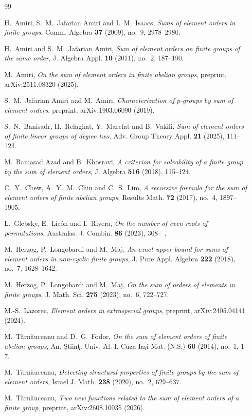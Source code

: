 \documentclass[10pt]{article}
\begin{document}
\begin{thebibliography}{99}

H.~Amiri, S.~M.~Jafarian Amiri and I.~M.~Isaacs,
\emph{Sums of element orders in finite groups},
Comm. Algebra \textbf{37} (2009), no.~9, 2978--2980.

H.~Amiri and S.~M.~Jafarian Amiri,
\emph{Sum of element orders on finite groups of the same order},
J. Algebra Appl. \textbf{10} (2011), no.~2, 187--190.

M.~Amiri,
\emph{On the sum of element orders in finite abelian groups},
preprint, arXiv:2511.08320 (2025).

S.~M.~Jafarian Amiri and M.~Amiri,
\emph{Characterization of $p$-groups by sum of element orders},
preprint, arXiv:1903.06090 (2019).

S.~N.~Banisadr, H.~Refaghat, Y.~Marefat and B.~Vakili,
\emph{Sum of element orders of finite linear groups of degree two},
Adv. Group Theory Appl. \textbf{21} (2025), 111--123.

M.~Baniasad Azad and B.~Khosravi,
\emph{A criterion for solvability of a finite group by the sum of element orders},
J. Algebra \textbf{516} (2018), 115--124.

C.~Y.~Chew, A.~Y.~M.~Chin and C.~S.~Lim,
\emph{A recursive formula for the sum of element orders of finite abelian groups},
Results Math. \textbf{72} (2017), no.~4, 1897--1905.

L.~Glebsky, E.~Lic\'on and I.~Rivera,
\emph{On the number of even roots of permutations},
Australas. J. Combin. \textbf{86} (2023), 308--\,%
.

M.~Herzog, P.~Longobardi and M.~Maj,
\emph{An exact upper bound for sums of element orders in non-cyclic finite groups},
J. Pure Appl. Algebra \textbf{222} (2018), no.~7, 1628--1642.

M.~Herzog, P.~Longobardi and M.~Maj,
\emph{On the sum of orders of elements in finite groups},
J. Math. Sci. \textbf{275} (2023), no.~6, 722--727.

M.-S.~Lazorec,
\emph{Element orders in extraspecial groups},
preprint, arXiv:2405.04141 (2024).

M.~T\u{a}rn\u{a}uceanu and D.~G.~Fodor,
\emph{On the sum of element orders of finite abelian groups},
An. \c{S}tiin\c{t}. Univ. Al. I. Cuza Ia\c{s}i Mat. (N.S.) \textbf{60} (2014), no.~1, 1--7.

M.~T\u{a}rn\u{a}uceanu,
\emph{Detecting structural properties of finite groups by the sum of element orders},
Israel J. Math. \textbf{238} (2020), no.~2, 629--637.

M.~T\u{a}rn\u{a}uceanu,
\emph{Two new functions related to the sum of element orders of a finite group},
preprint, arXiv:2608.10035 (2026).

\end{thebibliography}
\end{document}
